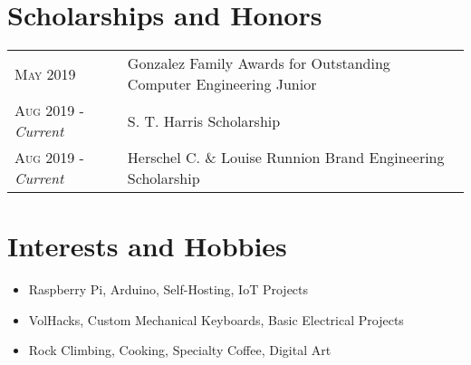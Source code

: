 \documentclass[a4paper,11pt]{article}
\begin{document}
\section{Scholarships and Honors}
\begin{tabularx}{\textwidth}{lX}
   \textsc{May 2019} & Gonzalez Family Awards for Outstanding Computer Engineering Junior\\
   \textsc{Aug 2019} \-- \emph{Current} & S. T. Harris Scholarship\\
   \textsc{Aug 2019} \-- \emph{Current} & Herschel C. \& Louise Runnion Brand Engineering Scholarship\\
\end{tabularx}

\section{Interests and Hobbies}
\begin{itemize}[topsep=1pt,itemsep=0pt,partopsep=1pt, parsep=1pt]
   \item Raspberry Pi, Arduino, Self-Hosting, IoT Projects
   \item VolHacks, Custom Mechanical Keyboards, Basic Electrical Projects
   \item Rock Climbing, Cooking, Specialty Coffee, Digital Art
\end{itemize}
\end{document}

